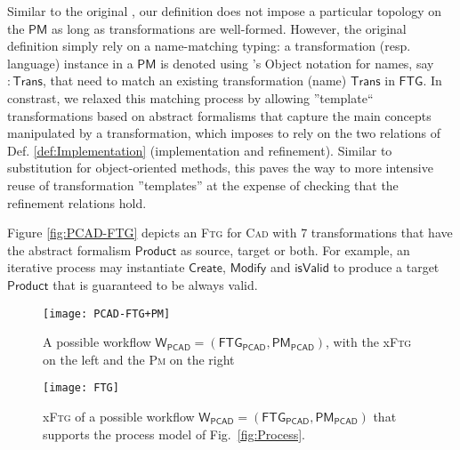 Similar to the original  
\cite{Mustafiz-etAl:2012,Lucio-Mustafiz-etAl:2013,TR:Lucio-Mustafiz-etAl:2012},
our definition does not impose a particular topology on the $\mathsf{PM}$ as 
long as transformations are well-formed. However, the original definition 
simply rely on a name-matching typing: a transformation (resp. language) 
instance in a $\mathsf{PM}$ is denoted using \UML's Object notation for names, 
say $\mathsf{:Trans}$, that need to match an existing transformation (name) 
$\mathsf{Trans}$ in $\mathsf{FTG}$. In constrast, we relaxed this matching 
process by allowing ''template`` transformations based on abstract formalisms 
that capture the main concepts manipulated by a transformation, which imposes 
to rely on the two relations of Def. \ref{def:Implementation} (implementation 
and refinement). Similar to substitution for object-oriented methods, this 
paves the way to more intensive reuse of transformation ''templates'' at the 
expense of checking that the refinement relations hold.

\begin{Example}
   Figure \ref{fig:PCAD-FTG} depicts an \textsc{Ftg} for \textsc{Cad} with 7 
transformations that have the abstract formalism $\mathsf{Product}$ as source, 
target or both. For example, an iterative process may instantiate 
$\mathsf{Create}$, $\mathsf{Modify}$ and $\mathsf{isValid}$ to produce a target 
$\mathsf{Product}$ that is guaranteed to be always valid.  

\begin{figure}[t]
   \centering
   \texttt{[image: PCAD-FTG+PM]}
   \caption{A possible workflow $\mathsf{W_{PCAD}} = (\mathsf{FTG_{PCAD}}, 
\mathsf{PM_{PCAD}})$, with the x\textsc{Ftg} on the left and the \textsc{Pm} 
on the right}%
   \label{fig:PCAD-MM}%
\end{figure}


\begin{figure}[t]
   \centering
   \texttt{[image: FTG]}
   \caption{x\textsc{Ftg} of a possible workflow $\mathsf{W_{PCAD}} = (\mathsf{FTG_{PCAD}}, 
\mathsf{PM_{PCAD}})$ that supports the process model of Fig.~\ref{fig:Process}.}%
   \label{fig:PCAD-MM}%
\end{figure}

\end{Example}




